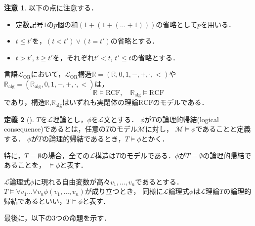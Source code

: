 \documentclass[uplatex, dvipdfmx]{jsarticle}
\numberwithin{equation}{section}
\newcommand{\R}{\mathbb{R}}
\newcommand{\Ralg}{\mathbb{R}_\mathrm{alg}}
\newcommand{\RCF}{\mathrm{RCF}}
\theoremstyle{definition}
\newtheorem{definition}{定義}[section]
\newtheorem{remark}[definition]{注意}
\begin{document}
\begin{remark}以下の点に注意する．
     \begin{itemize}
          \item 
          定数記号$1$の$p$個の和$(1+(1 + (\dots + 1)))$の省略として$p$を用いる．
          \item 
          $t \leq t'$を，$(t<t') \lor (t=t')$の省略とする．
          \item
          $t > t'$, $t \geq t'$を，それぞれ$t' < t$, $t' \leq t$の省略とする．
     \end{itemize}
\end{remark}


言語$\mathcal{L}_{\mathrm{OR}}$において，$\mathcal{L}_\mathrm{OR}$構造$\R=(\R,0,1,-,+,\cdot,<)$や$\Ralg=(\Ralg,0,1,-,+,\cdot,<)$は，
\begin{equation}
     \R \models \RCF, \quad \Ralg \models \RCF
\end{equation}
であり，構造$\R$,$\Ralg$はいずれも実閉体の理論$\RCF$のモデルである．

\begin{definition}[{\cite[Definition 1.2.12]{MR1924282}}]
     $T$を$\mathcal{L}$理論とし，$\phi$を$\mathcal{L}$文とする．
     $\phi$が$T$の論理的帰結(logical consequence)であるとは，任意の$T$のモデル$\mathcal{M}$に対し，
     $\mathcal{M} \models \phi$であることと定義する．
     $\phi$が$T$の論理的帰結であるとき，$T \models \phi$とかく．

     特に，$T = \emptyset$の場合，全ての$\mathcal{L}$構造は$T$のモデルである．$\phi$が$T=\emptyset$の論理的帰結であることを，
     $\models \phi$と表す．
\end{definition}

$\mathcal{L}$論理式$\phi$に現れる自由変数が高々$v_1, \dots, v_n$であるとする．
$T \models \forall v_1 \dots \forall v_n \phi(v_1, \dots, v_n)$が成り立つとき，
同様に$\mathcal{L}$論理式$\phi$は$\mathcal{L}$理論$T$の論理的帰結であるといい，$T \models \phi$と表す．

最後に，以下の3つの命題を示す．
\end{document}
